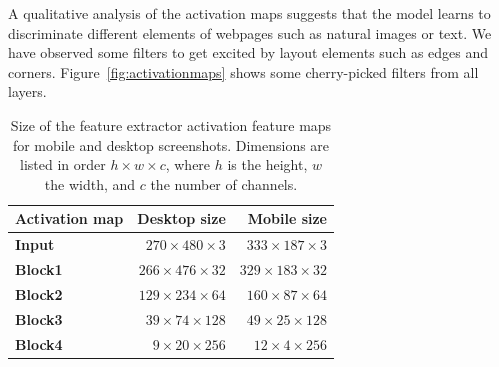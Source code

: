 A qualitative analysis of the activation maps suggests that the model learns to discriminate different elements of webpages such as natural images or text. We have observed some filters to get excited by layout elements such as edges and corners. Figure~\ref{fig:activationmaps} shows some cherry-picked filters from all layers.

\begin{table}
    \centering
    \begin{tabular}{lrr}
        \textbf{Activation map} & \textbf{Desktop size} & \textbf{Mobile size}\\\hline
        \textbf{Input} & $270\times480\times3$ & $333\times187\times3$\\
        \textbf{Block1} & $266\times476\times32$ & $329\times183\times32$\\
        \textbf{Block2} & $129\times234\times64$ & $160\times87\times64$\\
        \textbf{Block3} & $39\times74\times128$ & $49\times25\times128$\\
        \textbf{Block4} & $9\times20\times256$ & $12\times4\times256$\\
    \end{tabular}
    \caption[Size of feature extractor activation maps]{Size of the feature extractor activation feature maps for mobile and desktop screenshots. Dimensions are listed in order $h\times w\times c$, where $h$ is the height, $w$ the width, and $c$ the number of channels.}
    \label{tab:activationmaptensors}
\end{table}

